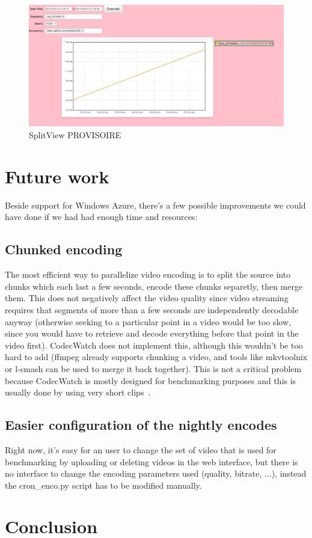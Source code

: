 \documentclass[a4paper,12pt]{article}
\begin{document}
\begin{figure}[!h]
	\centering
	\includegraphics[width=1\textwidth]{figures/graph1.png}
	\caption{SplitView PROVISOIRE}
	\label{fig:graph1}
\end{figure}



\section{Future work}
Beside support for Windows Azure, there's a few possible improvements we could
have done if we had had enough time and resources:
\subsection{Chunked encoding}
The most efficient way to parallelize video encoding is to split the source into
chunks which each last a few seconds, encode these chunks separetly, then merge
them. This does not negatively affect the video quality since video streaming
requires that segments of more than a few seconds are independently decodable
anyway (otherwise seeking to a particular point in a video would be too slow,
since you would have to retrieve and decode everything before that point in the
video first). CodecWatch does not implement this, although this wouldn't be too
hard to add (ffmpeg already supports chunking a video, and tools like mkvtoolnix
or l-smash can be used to merge it back together). This is not a critical
problem because CodecWatch is mostly designed for benchmarking purposes and this
is usually done by using very short clips~\cite{derf}.
\subsection{Easier configuration of the nightly encodes}
Right now, it's easy for an user to change the set of video that is used for
benchmarking by uploading or deleting videos in the web interface, but there is
no interface to change the encoding parameters used (quality, bitrate, ...),
instead the cron_enco.py script has to be modified manually.

\section{Conclusion}

\appendix
{}

\end{document}
